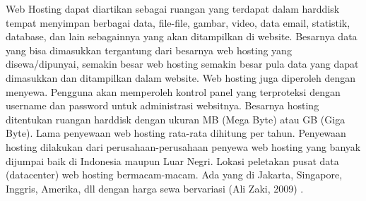 Web Hosting dapat diartikan sebagai ruangan yang terdapat dalam harddisk tempat menyimpan berbagai data, file-file, gambar, video, data email, statistik, database, dan lain sebagainnya yang akan ditampilkan di website. Besarnya data yang bisa dimasukkan tergantung dari besarnya web hosting yang disewa/dipunyai, semakin besar web hosting semakin besar pula data yang dapat dimasukkan dan ditampilkan dalam website. Web hosting juga diperoleh dengan menyewa. Pengguna akan memperoleh kontrol panel yang terproteksi dengan username dan password untuk administrasi websitnya. Besarnya hosting ditentukan ruangan harddisk dengan ukuran MB (Mega Byte) atau GB (Giga Byte). Lama penyewaan web hosting rata-rata dihitung per tahun. Penyewaan hosting dilakukan dari perusahaan-perusahaan penyewa web hosting yang banyak dijumpai baik di Indonesia maupun Luar Negri. Lokasi peletakan pusat data (datacenter) web hosting bermacam-macam. Ada yang di Jakarta, Singapore, Inggris, Amerika, dll dengan harga sewa bervariasi (Ali Zaki, 2009) \cite{7}. 
